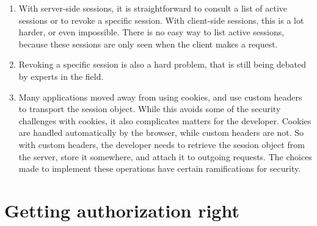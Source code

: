 \documentclass[../main.tex]{subfiles}
\begin{document}
\begin{itemize}
\begin{enumerate}
\item With server-side sessions, it is straightforward to consult a list of active sessions or to revoke a specific session. With client-side sessions, this is a lot harder, or even impossible. There is no easy way to list active sessions, because these sessions are only seen when the client makes a request.
\item Revoking a specific session is also a hard problem, that is still being debated by experts in the field.
\item Many applications moved away from using cookies, and use custom headers to transport the session object. While this avoids some of the security challenges with cookies, it also complicates matters for the developer. Cookies are handled automatically by the browser, while custom headers are not. So with custom headers, the developer needs to retrieve the session object from the server, store it somewhere, and attach it to outgoing requests. The choices made to implement these operations have certain ramifications for security.
\end{enumerate}
\end{itemize}

\section{Getting authorization right}
\end{document}
